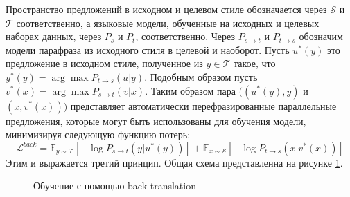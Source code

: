 

Пространство предложений в исходном и целевом стиле обозначается через $\mathcal{S}$ и $\mathcal{T}$ соответственно, а языковые модели, обученные на исходных и целевых наборах данных, через $P_s$ и $P_t$, соответственно.
Через $P_{s \rightarrow t}$ и $P_{t \rightarrow s}$ обозначим модели парафраза из исходного стиля в целевой и наоборот.
Пусть $u^*(y)$ это предложение в исходном стиле, полученное из $y \in \mathcal{T}$ такое, что $y^*(y) = \arg\max P_{t \rightarrow s}(u|y)$. Подобным образом пусть $v^*(x) = \arg \max P_{s \rightarrow t}(v|x)$.
Таким образом пара $((u^*(y), y)$ и $(x, v^*(x)))$ представляет автоматически перефразированные параллельные предложения, которые могут быть использованы для обучения модели, минимизируя следующую функцию потерь:
$$
\mathcal{L}^{back} = 
\mathbb{E}_{y \sim \mathcal{T}} [-\log P_{s \rightarrow t}(y|u^*(y))] +
\mathbb{E}_{x \sim \mathcal{S}} [-\log P_{t \rightarrow s}(x|v^*(x))]
$$
Этим и выражается третий принцип. Общая схема представленна на рисунке \ref{fig:lample_backtranslation}.

\begin{figure}[ht]
  \centering
  \caption{Обучение с помощью back-translation}
  \label{fig:lample_backtranslation}
\end{figure}

